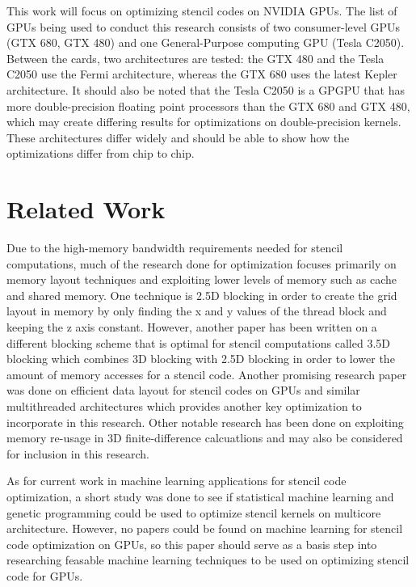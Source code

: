 \documentclass[conference]{IEEEtran}
\begin{document}
This work will focus on optimizing stencil codes on NVIDIA GPUs. The list of GPUs being used to conduct this research consists of two consumer-level
GPUs (GTX 680, GTX 480) and one General-Purpose computing GPU (Tesla C2050). Between the cards, two architectures are tested: the GTX 480 and the Tesla
C2050 use the Fermi architecture, whereas the GTX 680 uses the latest Kepler architecture. It should also be noted that the Tesla C2050 is a GPGPU that
has more double-precision floating point processors than the GTX 680 and GTX 480, which may create differing results for optimizations on double-precision
kernels\cite{NVIDIA}. These architectures differ widely and should be able to show how the optimizations differ from chip to chip.

\section{Related Work}
Due to the high-memory bandwidth requirements needed for stencil computations, much of the research done for optimization focuses primarily on memory layout techniques and exploiting lower levels of memory such as cache and shared memory. One technique is 2.5D blocking in order to create the grid layout in memory by only finding the x and y values of the thread block and keeping the z axis constant\cite{Datta}. However, another paper has been written on a different blocking scheme that is optimal for stencil computations called 3.5D blocking which combines 3D blocking with 2.5D blocking in order to lower the amount of memory accesses for a stencil code\cite{Nguy}. Another promising research paper was done on efficient data layout for stencil codes on GPUs and similar multithreaded architectures which provides another key optimization to incorporate in this research\cite{Jaeger}. Other notable research has been done on exploiting memory re-usage in 3D finite-difference calcuatlions\cite{Mici} and may also be considered for inclusion in this research.  


As for current work in machine learning applications for stencil code optimization, a short study was done to see if statistical machine learning and genetic programming could be used to optimize stencil kernels on multicore architecture\cite{Gana}. However, no papers could be found on machine learning for stencil code optimization on GPUs, so this paper should serve as a basis step into researching feasable machine learning techniques to be used on optimizing stencil code for GPUs.
\end{document}
